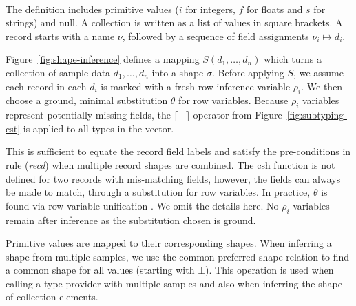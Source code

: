 \documentclass[10pt]{sigplanconf}
\newcommand{\kvd}[1]{\textnormal{\textcolor{kvdclr}{\sffamily #1}}}
\newcommand{\ident}[1]{\textnormal{\sffamily #1}}
\newcommand{\addopt}[1]{\lceil#1\rceil}
\newcommand{\semalt}[1]{S(#1)}
\begin{document}
~

\noindent
The definition includes primitive values ($i$ for integers, $f$ for floats
and $s$ for strings) and \kvd{null}. A collection is written as a 
list of values in square brackets. A record starts with a name $\nu$, followed by a 
sequence of field assignments $\nu_i \mapsto d_i$.

Figure~\ref{fig:shape-inference} defines a mapping $\semalt{d_1,\ldots,d_n}$ which turns a 
collection of sample data $d_1, \ldots, d_n$ into a shape $\sigma$. Before applying $S$, we assume 
each record in each $d_i$ is marked with a fresh row inference variable $\rho_i$. 
We then choose a ground, minimal substitution $\theta$ for row variables. Because $\rho_i$ variables 
represent potentially missing fields, the $\addopt{-}$ operator from Figure~\ref{fig:subtyping-cst} 
is applied to all types in the vector. 

This is sufficient to equate the record field labels and satisfy the pre-conditions in rule 
(\emph{recd}) when multiple record shapes are combined. The \ident{csh} function is not defined for 
two records with mis-matching fields, however, the fields can always be made to match, through 
a substitution for row variables. In practice, $\theta$ is found via row 
variable unification \cite{rows-remy}. We omit the details here. No $\rho_i$ variables remain after 
inference as the substitution chosen is ground.

Primitive  values are mapped to their corresponding shapes. 
When inferring a shape from multiple samples, we use the common preferred shape relation to find a 
common shape for all values (starting with $\bot$). This operation is used  
when calling a type provider with multiple samples and also when inferring the shape of collection
elements.

\end{document}
